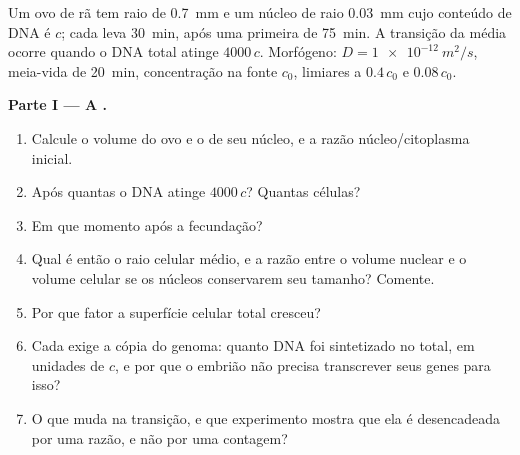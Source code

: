 \begin{problem}
\label{pb:b2:vertebrate-development:1}
Um ovo de rã tem raio de \qty{0.7}{mm} e um núcleo de raio
\qty{0.03}{mm} cujo conteúdo de DNA é $c$; cada  leva
\qty{30}{min}, após uma primeira de \qty{75}{min}. A transição da
 média ocorre quando o DNA total atinge $4000\,c$. Morfógeno:
$D =
\qty{1e-12}{m^2/s}$, meia-vida de \qty{20}{min}, concentração na fonte
$c_0$, limiares a $0.4\,c_0$ e $0.08\,c_0$.

\medskip
\noindent\textbf{Parte I --- A .}
\begin{enumerate}
  \item Calcule o volume do ovo e o de seu núcleo, e a razão
        núcleo/citoplasma inicial.
  \item Após quantas  o DNA atinge $4000\,c$? Quantas células?
  \item Em que momento após a fecundação?
  \item Qual é então o raio celular médio, e a razão entre o volume
        nuclear e o volume celular se os núcleos conservarem seu
        tamanho? Comente.
  \item Por que fator a superfície celular total cresceu?
  \item Cada  exige a cópia do genoma: quanto DNA foi
        sintetizado no total, em unidades de $c$, e por que o embrião
        não precisa transcrever seus genes para isso?
  \item O que muda na transição, e que experimento mostra que ela é
        desencadeada por uma razão, e não por uma contagem?
\end{enumerate}


\end{problem}
